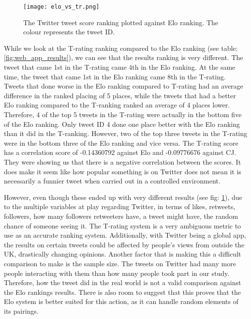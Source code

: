 		

	\begin{figure}[t]
		\centering
		\texttt{[image: elo\_vs\_tr.png]}
		\caption{The Twitter tweet score ranking plotted against Elo ranking. The colour represents the tweet ID.}
		\label{fig:elo_vs_tranking}
		
	\end{figure}

	While we look at the T-rating ranking compared to the Elo ranking (see table: \ref{fig:web_app_results}), we can see that the results ranking is very different. The tweet that came 1st in the T-rating came 4th in the Elo ranking. At the same time, the tweet that came 1st in the Elo ranking came 8th in the T-rating.  Tweets that done worse in the Elo ranking compared to T-rating had an average difference in the ranked placing of 5 places, while the tweets that had a better Elo ranking compared to the T-ranking ranked an average of 4 places lower. Therefore, 4 of the top 5 tweets in the T-rating were actually in the bottom five of the Elo ranking. Only tweet ID 4 done one place better with the Elo ranking than it did in the T-ranking. However, two of the top three tweets in the T-rating were in the bottom three of the Elo ranking and vice versa. The T-rating score has a correlation score of -0.14360792 against Elo and -0.09776676 against CJ. They were showing us that there is a negative correlation between the scores. It does make it seem like how popular something is on Twitter does not mean it is necessarily a funnier tweet when carried out in a controlled environment.
	
	However, even though these ended up with very different results (see fig: \ref{fig:elo_vs_tranking}), due to the multiple variables at play regarding Twitter, in terms of likes, retweets, followers, how many followers retweeters have, a tweet might have, the random chance of someone seeing it. The T-rating system is a very ambiguous metric to use as an accurate ranking system. Additionally, with Twitter being a global app, the results on certain tweets could be affected by people's views from outside the UK, drastically changing opinions. Another factor that is making this a difficult comparison to make is the sample size. The tweets on Twitter had many more people interacting with them than how many people took part in our study. Therefore, how the tweet did in the real world is not a valid comparison against the Elo rankings results. There is also room to suggest that this proves that the Elo system is better suited for this action, as it can handle random elements of its pairings. 
	
